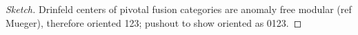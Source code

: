 \documentclass{amsart}
\begin{document}
\begin{proof}[Sketch]
Drinfeld centers of pivotal fusion categories are anomaly free modular (ref Mueger), therefore oriented 123; pushout to show oriented as 0123.
\end{proof}







\end{document}
